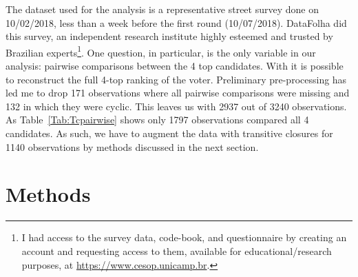 \documentclass[hidelinks,11pt]{article}
\begin{document}
The dataset used for the analysis is a representative street survey done on
10/02/2018, less than a week before the first round (10/07/2018). DataFolha did
this survey, an independent research institute highly esteemed and trusted by
Brazilian experts\footnote{I had access to the survey data, code-book, and
  questionnaire by creating an account and requesting access to them, available
  for educational/research purposes, at \url{https://www.cesop.unicamp.br}.}.
One question, in particular, is the only variable in our analysis: pairwise
comparisons between the 4 top candidates. With it is possible to reconstruct the
full 4-top ranking of the voter. Preliminary pre-processing has led me to drop
171 observations where all pairwise comparisons were missing and 132 in which
they were cyclic. This leaves us with 2937 out of 3240 observations. As
Table~\ref{Tab:Tcpairwise} shows only 1797 observations compared all 4
candidates. As such, we have to augment the data with transitive closures for
1140 observations by methods discussed in the next section.

\begin{table}[]\centering
{}
\caption{Frequency of pairwise comparisons in the dataset.}

\label{Tab:Tcpairwise}
\end{table}


\section{Methods}
\end{document}
